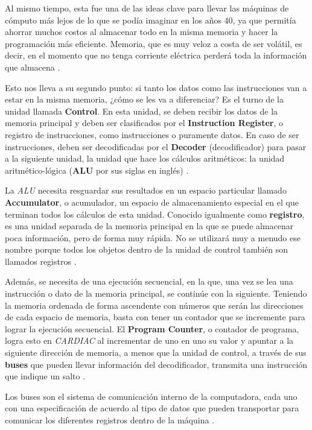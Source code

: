 \documentclass[letterpaper,12pt,oneside]{book}
\begin{document}
		Al mismo tiempo, esta fue una de las ideas clave para llevar las
		máquinas de cómputo más lejos de lo que se podía imaginar en los años 40, ya que permitía ahorrar muchos costos al almacenar todo en la misma memoria y hacer la programación más eficiente. Memoria, que es muy veloz a costa de ser volátil, es decir, en el momento que no tenga corriente eléctrica perderá
		toda la información que almacena \cite{tanenbaum_structured_2013}.
		
		Esto nos lleva a su segundo punto: si tanto los datos como las instrucciones van a estar en la misma memoria, ¿cómo se les va a diferenciar? Es el turno
		de la unidad llamada \textbf{Control}. En esta unidad, se deben recibir los datos de la memoria principal y deben ser 
		clasificados por el  \textbf{Instruction Register}, o registro de instrucciones,
		como instrucciones o puramente datos. En caso de ser instrucciones, deben ser decodificadas por el \textbf{Decoder} (decodificador) para pasar a la siguiente  unidad, la 
		unidad
		que hace los cálculos aritméticos: la unidad aritmético-lógica (\textbf{ALU} por sus siglas en inglés) \cite{von_neumann_papers_1987}.

		La \textit{ALU} necesita resguardar sus 
		resultados en un espacio particular llamado \textbf{Accumulator}, o acumulador, un espacio de almacenamiento especial en el que terminan todos los 
		cálculos
		de esta unidad. Conocido igualmente como \textbf{registro},  es una unidad separada de la memoria principal en la que se puede almacenar 
		poca información, pero de forma muy rápida. No se utilizará muy a menudo ese nombre porque todos los objetos dentro de la unidad de control también son llamados registros \cite{von_neumann_papers_1987}.
		
		Además, se necesita de una ejecución secuencial, en la que, una vez se lea una instrucción o dato de la memoria principal, se continúe con la siguiente. Teniendo la memoria ordenada de forma ascendente con números que serán las direcciones de cada espacio de memoria, basta con tener un 
		contador
		que se incremente para lograr la ejecución secuencial. El \textbf{Program Counter}, o contador de programa, logra esto en \textit{CARDIAC}  al incrementar de uno
		en uno su valor y apuntar a la siguiente dirección de memoria,
	a menos que la unidad de control, a través de sus \textbf{buses} que pueden llevar información del decodificador, transmita una instrucción que indique un salto \cite{von_neumann_papers_1987}.

		Los buses son el sistema de comunicación interno de la computadora, cada uno con una especificación de acuerdo al tipo
		de datos que pueden transportar para comunicar los diferentes registros dentro de la máquina \cite{von_neumann_papers_1987}.
		
\end{document}
